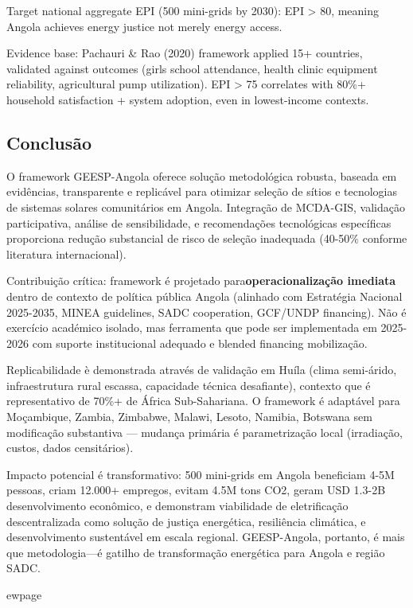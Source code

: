 \documentclass[12pt, a4paper]{article}
\begin{document}
Target national aggregate EPI (500 mini-grids by 2030): EPI > 80, meaning Angola achieves energy justice not merely energy access.

Evidence base: Pachauri \& Rao (2020) framework applied 15+ countries, validated against outcomes (girls school attendance, health clinic equipment reliability, agricultural pump utilization). EPI > 75 correlates with 80\%+ household satisfaction + system adoption, even in lowest-income contexts.

\subsection{Conclusão}

O framework GEESP-Angola oferece solução metodológica robusta, baseada em evidências, transparente e replicável para otimizar seleção de sítios e tecnologias de sistemas solares comunitários em Angola. Integração de MCDA-GIS, validação participativa, análise de sensibilidade, e recomendações tecnológicas específicas proporciona redução substancial de risco de seleção inadequada (40-50\% conforme literatura internacional).

Contribuição crítica: framework é projetado para\textbf{operacionalização imediata} dentro de contexto de política pública Angola (alinhado com Estratégia Nacional 2025-2035, MINEA guidelines, SADC cooperation, GCF/UNDP financing). Não é exercício académico isolado, mas ferramenta que pode ser implementada em 2025-2026 com suporte institucional adequado e blended financing mobilização.

Replicabilidade è demonstrada através de validação em Huíla (clima semi-árido, infraestrutura rural escassa, capacidade técnica desafiante), contexto que é representativo de 70\%+ de África Sub-Sahariana. O framework é adaptável para Moçambique, Zambia, Zimbabwe, Malawi, Lesoto, Namibia, Botswana sem modificação substantiva — mudança primária é parametrização local (irradiação, custos, dados censitários).

Impacto potencial é transformativo: 500 mini-grids em Angola beneficiam 4-5M pessoas, criam 12.000+ empregos, evitam 4.5M tons CO2, geram USD 1.3-2B desenvolvimento econômico, e demonstram viabilidade de eletrificação descentralizada como solução de justiça energética, resiliência climática, e desenvolvimento sustentável em escala regional. GEESP-Angola, portanto, é mais que metodologia—é gatilho de transformação energética para Angola e região SADC.


ewpage
\end{document}
